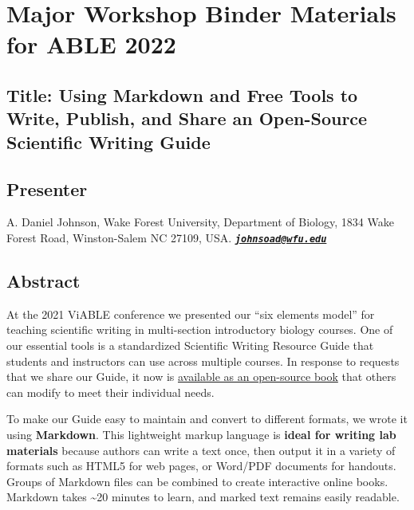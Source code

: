 \documentclass[
]{article}
\author{}
\date{\vspace{-2.5em}}
\begin{document}
\hypertarget{major-workshop-binder-materials-for-able-2022}{%
\section{Major Workshop Binder Materials for ABLE
2022}\label{major-workshop-binder-materials-for-able-2022}}

\hypertarget{title-using-markdown-and-free-tools-to-write-publish-and-share-an-open-source-scientific-writing-guide}{%
\subsection{Title: Using Markdown and Free Tools to Write, Publish, and
Share an Open-Source Scientific Writing
Guide}\label{title-using-markdown-and-free-tools-to-write-publish-and-share-an-open-source-scientific-writing-guide}}

\hypertarget{presenter}{%
\subsection{Presenter}\label{presenter}}

A. Daniel Johnson, Wake Forest University, Department of Biology, 1834
Wake Forest Road, Winston-Salem NC 27109, USA.
\textbf{\emph{\href{mailto:johnsoad@wfu.edu}{\nolinkurl{johnsoad@wfu.edu}}}}

\hypertarget{abstract}{%
\subsection{Abstract}\label{abstract}}

At the 2021 ViABLE conference we presented our ``six elements model''
for teaching scientific writing in multi-section introductory biology
courses. One of our essential tools is a standardized Scientific Writing
Resource Guide that students and instructors can use across multiple
courses. In response to requests that we share our Guide, it now is
\href{https://adanieljohnson.github.io/SWP_student_writing_guide/}{available
as an open-source book} that others can modify to meet their individual
needs.

To make our Guide easy to maintain and convert to different formats, we
wrote it using \textbf{Markdown}. This lightweight markup language is
\textbf{ideal for writing lab materials} because authors can write a
text once, then output it in a variety of formats such as HTML5 for web
pages, or Word/PDF documents for handouts. Groups of Markdown files can
be combined to create interactive online books. Markdown takes
\textasciitilde20 minutes to learn, and marked text remains easily
readable.
\end{document}
